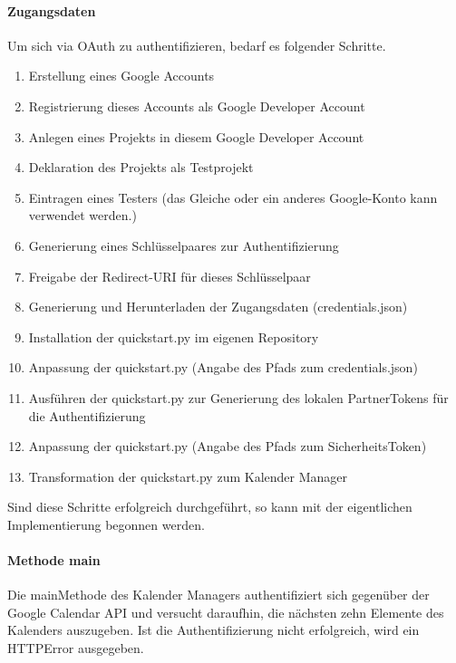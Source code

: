             \paragraph{Zugangsdaten}
                Um sich via OAuth zu authentifizieren, bedarf es folgender Schritte.
                \begin{enumerate}
                    \item Erstellung eines Google Accounts
                    \item Registrierung dieses Accounts als Google Developer Account
                    \item Anlegen eines Projekts in diesem Google Developer Account
                    \item Deklaration des Projekts als Testprojekt
                    \item Eintragen eines Testers (das Gleiche oder ein anderes Google-Konto kann verwendet werden.)
                    \item Generierung eines Schlüsselpaares zur Authentifizierung
                    \item Freigabe der Redirect-URI für dieses Schlüsselpaar
                    \item Generierung und Herunterladen der Zugangsdaten (credentials.json)
                    \item Installation der quickstart.py im eigenen Repository
                    \item Anpassung der quickstart.py (Angabe des Pfads zum credentials.json)
                    \item Ausführen der quickstart.py zur Generierung des lokalen Partner\-Tokens für die Authentifizierung
                    \item Anpassung der quickstart.py (Angabe des Pfads zum Sicherheits\-Token)
                    \item Transformation der quickstart.py zum Kalender Manager
                \end{enumerate}
                Sind diese Schritte erfolgreich durchgeführt, so kann mit der eigentlichen Implementierung begonnen werden.


            \paragraph{Methode main}
                Die main\-Methode des Kalender Managers authentifiziert sich gegenüber der Google Calendar API und versucht daraufhin, die nächsten zehn Elemente des Kalenders auszugeben. Ist die Authentifizierung nicht erfolgreich, wird ein HTTP\-Error ausgegeben. 

